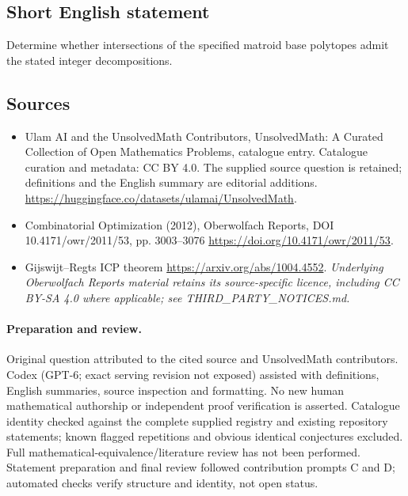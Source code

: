 \documentclass[11pt]{article}
\begin{document}
\subsection{Short English statement}
Determine whether intersections of the specified matroid base polytopes admit the stated integer decompositions.
\subsection{Sources}
\begin{itemize}
\item[\hypertarget{source:statement:1}{S1}] Ulam AI and the UnsolvedMath Contributors, UnsolvedMath: A Curated Collection of Open Mathematics Problems, catalogue entry. Catalogue curation and metadata: CC BY 4.0. The supplied source question is retained; definitions and the English summary are editorial additions.
\url{https://huggingface.co/datasets/ulamai/UnsolvedMath}.
\item[\hypertarget{source:statement:2}{S2}] Combinatorial Optimization (2012), Oberwolfach Reports, DOI 10.4171/owr/2011/53, pp. 3003--3076
\url{https://doi.org/10.4171/owr/2011/53}.
\item[\hypertarget{source:statement:3}{S3}] Gijswijt--Regts ICP theorem
\url{https://arxiv.org/abs/1004.4552}.
\textit{Underlying Oberwolfach Reports material retains its source-specific licence, including CC BY-SA 4.0 where applicable; see THIRD\_PARTY\_NOTICES.md.}
\end{itemize}
\paragraph{Preparation and review.}
Original question attributed to the cited source and UnsolvedMath contributors. Codex (GPT-6; exact serving revision not exposed) assisted with definitions, English summaries, source inspection and formatting. No new human mathematical authorship or independent proof verification is asserted. Catalogue identity checked against the complete supplied registry and existing repository statements; known flagged repetitions and obvious identical conjectures excluded. Full mathematical-equivalence/literature review has not been performed. Statement preparation and final review followed contribution prompts C and D; automated checks verify structure and identity, not open status.
\label{end:statement}
\end{document}
